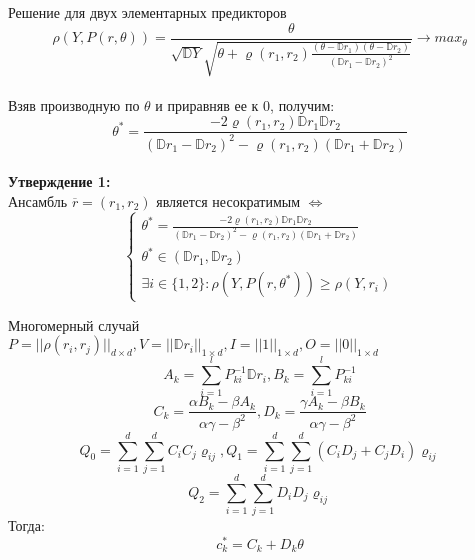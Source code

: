 \documentclass{beamer}
\begin{document}
\begin{frame}{Решение для двух элементарных предикторов}
$$
\rho(Y, P(r, \theta)) = \frac{\theta}{\sqrt{\mathbb{D}Y} \sqrt{ \theta + \varrho(r_1, r_2) \frac{(\theta - \mathbb{D}r_1)(\theta - \mathbb{D}r_2)}{(\mathbb{D}r_1 - \mathbb{D}r_2)^2} }} \rightarrow max_\theta
$$ \\
Взяв производную по $\theta$ и приравняв ее к $0$, получим: \\
$$
    \theta^* = \frac{-2 \varrho(r_1, r_2) \mathbb{D}r_1 \mathbb{D} r_2}{(\mathbb{D}r_1 - \mathbb{D}r_2)^2 - \varrho(r_1, r_2)(\mathbb{D}r_1 + \mathbb{D} r_2)}
$$
\\
\textbf{Утверждение 1:} \\ Ансамбль $\overline{r} = (r_1, r_2)$ является несократимым $\Longleftrightarrow$ 
\begin{equation}
\begin{cases}
    \theta^* = \frac{-2 \varrho(r_1, r_2) \mathbb{D}r_1 \mathbb{D} r_2}{(\mathbb{D}r_1 - \mathbb{D}r_2)^2 - \varrho(r_1, r_2)(\mathbb{D}r_1 + \mathbb{D} r_2)} \\
    \theta^* \in (\mathbb{D}r_1, \mathbb{D}r_2) \\
    \exists i \in \{1, 2\}: \rho(Y, P(r, \theta^*)) \geq \rho(Y, r_i) 
\end{cases}
\end{equation}
\end{frame}
\begin{frame}{Многомерный случай}
$
P = \big\vert \big\vert \rho(r_i, r_j) \big\vert \big\vert_{d \times d}, V = \big\vert \big\vert \mathbb{D} r_i \big\vert \big\vert_{1 \times d}, I = \big\vert \big\vert 1 \big\vert \big\vert_{1 \times d}, O = \big\vert \big\vert 0 \big\vert \big\vert_{1 \times d}
$
$$
A_k = \sum_{i=1}^l P^{-1}_{ki}\mathbb{D}r_i, B_k = \sum_{i=1}^l P^{-1}_{ki}
$$
$$
C_k = \frac{\alpha B_k - \beta A_k}{\alpha \gamma - \beta^2}, D_k = \frac{\gamma A_k - \beta B_k}{\alpha \gamma - \beta^2}
$$
$$
Q_0 = \sum_{i=1}^{d} \sum_{j=1}^{d} C_i C_j \varrho_{ij}, Q_1 = \sum_{i=1}^{d} \sum_{j=1}^{d} (C_i D_j  + C_j D_i)\varrho_{ij}
$$
$$
Q_2 = \sum_{i=1}^{d} \sum_{j=1}^{d} D_i D_j \varrho_{ij}
$$
Тогда:
\begin{equation}
    \boxed{c_k^* = C_k + D_k \theta}
\end{equation}
\end{frame}
\end{document}
